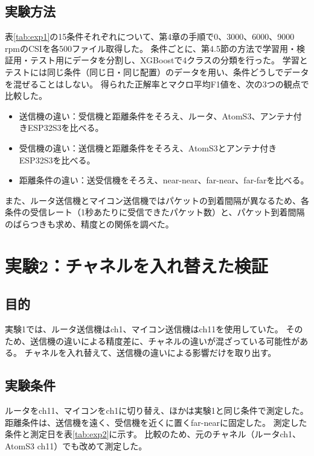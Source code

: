 \documentclass[uplatex, 12pt]{ujbook}
\begin{document}
\section{実験方法}
表\ref{tab:exp1}の15条件それぞれについて、第4章の手順で0、3000、6000、9000\,rpmのCSIを各500ファイル取得した。
条件ごとに、第4.5節の方法で学習用・検証用・テスト用にデータを分割し、XGBoostで4クラスの分類を行った。
学習とテストには同じ条件（同じ日・同じ配置）のデータを用い、条件どうしでデータを混ぜることはしない。
得られた正解率とマクロ平均F1値を、次の3つの観点で比較した。
\begin{itemize}
  \item 送信機の違い：受信機と距離条件をそろえ、ルータ、AtomS3、アンテナ付きESP32S3を比べる。
  \item 受信機の違い：送信機と距離条件をそろえ、AtomS3とアンテナ付きESP32S3を比べる。
  \item 距離条件の違い：送受信機をそろえ、near-near、far-near、far-farを比べる。
\end{itemize}
また、ルータ送信機とマイコン送信機ではパケットの到着間隔が異なるため、各条件の受信レート（1秒あたりに受信できたパケット数）と、パケット到着間隔のばらつきも求め、精度との関係を調べた。

\chapter{実験2：チャネルを入れ替えた検証}
\section{目的}
実験1では、ルータ送信機はch1、マイコン送信機はch11を使用していた。
そのため、送信機の違いによる精度差に、チャネルの違いが混ざっている可能性がある。
チャネルを入れ替えて、送信機の違いによる影響だけを取り出す。

\section{実験条件}
ルータをch11、マイコンをch1に切り替え、ほかは実験1と同じ条件で測定した。
距離条件は、送信機を遠く、受信機を近くに置くfar-nearに固定した。
測定した条件と測定日を表\ref{tab:exp2}に示す。
比較のため、元のチャネル（ルータch1、AtomS3 ch11）でも改めて測定した。
\end{document}
